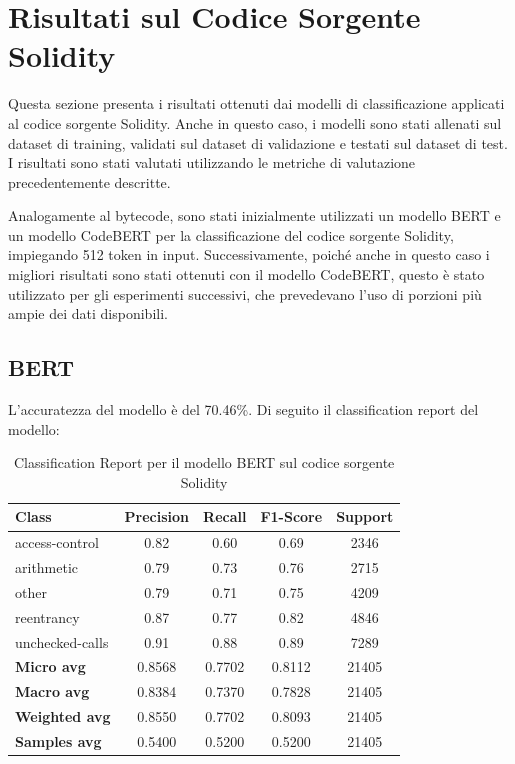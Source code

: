 \documentclass[../../Thesis.tex]{subfiles}
\begin{document}
\section{Risultati sul Codice Sorgente Solidity}

Questa sezione presenta i risultati ottenuti dai modelli di classificazione applicati al codice sorgente Solidity. Anche in questo caso, i modelli sono stati allenati sul dataset di training, validati sul dataset di validazione e testati sul dataset di test. I risultati sono stati valutati utilizzando le metriche di valutazione precedentemente descritte.

Analogamente al bytecode, sono stati inizialmente utilizzati un modello BERT e un modello CodeBERT per la classificazione del codice sorgente Solidity, impiegando 512 token in input. Successivamente, poiché anche in questo caso i migliori risultati sono stati ottenuti con il modello CodeBERT, questo è stato utilizzato per gli esperimenti successivi, che prevedevano l'uso di porzioni più ampie dei dati disponibili.
\subsection{BERT}
L'accuratezza del modello è del 70.46\%. Di seguito il classification report del modello:
\begin{table}[H]
    \centering
    \small
    \begin{tabular}{lcccc}
    \hline
    \textbf{Class} & \textbf{Precision} & \textbf{Recall} & \textbf{F1-Score} & \textbf{Support} \\
    \hline
    access-control & 0.82 & 0.60 & 0.69 & 2346 \\
    arithmetic & 0.79 & 0.73 & 0.76 & 2715 \\
    other & 0.79 & 0.71 & 0.75 & 4209 \\
    reentrancy & 0.87 & 0.77 & 0.82 & 4846 \\
    unchecked-calls & 0.91 & 0.88 & 0.89 & 7289 \\
    \hline
    \textbf{Micro avg} & 0.8568 & 0.7702 & 0.8112 & 21405 \\
    \textbf{Macro avg} & 0.8384 & 0.7370 & 0.7828 & 21405 \\
    \textbf{Weighted avg} & 0.8550 & 0.7702 & 0.8093 & 21405 \\
    \textbf{Samples avg} & 0.5400 & 0.5200 & 0.5200 & 21405 \\
    \hline
    \end{tabular}
    \caption{Classification Report per il modello BERT sul codice sorgente Solidity}
\end{table}
\end{document}
